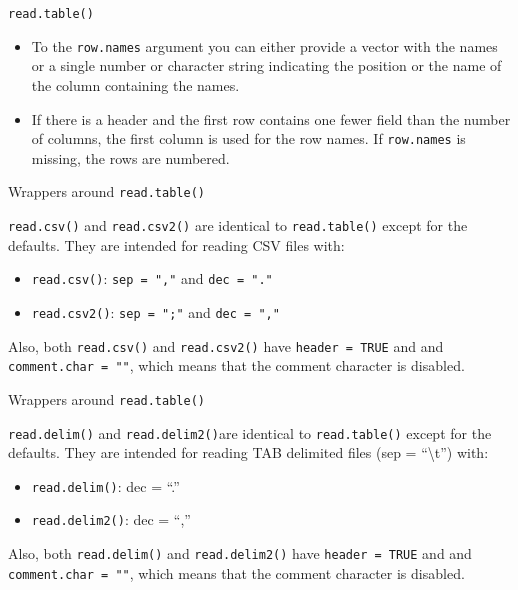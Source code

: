 \documentclass[ignorenonframetext,]{beamer}
\providecommand{\tightlist}{%
  \setlength{\itemsep}{0pt}\setlength{\parskip}{0pt}}
\begin{document}
\begin{frame}[fragile]{\texttt{read.table()}}
\protect\hypertarget{read.table-1}{}

\begin{itemize}
\item
  To the \texttt{row.names} argument you can either provide a vector
  with the names or a single number or character string indicating the
  position or the name of the column containing the names.
\item
  If there is a header and the first row contains one fewer field than
  the number of columns, the first column is used for the row names. If
  \texttt{row.names} is missing, the rows are numbered.
\end{itemize}

\end{frame}

\begin{frame}[fragile]{Wrappers around \texttt{read.table()}}
\protect\hypertarget{wrappers-around-read.table}{}

\texttt{read.csv()} and \texttt{read.csv2()} are identical to
\texttt{read.table()} except for the defaults. They are intended for
reading CSV files with:

\begin{itemize}
\item
  \texttt{read.csv()}: \texttt{sep\ =\ ","} and \texttt{dec\ =\ "."}
\item
  \texttt{read.csv2()}: \texttt{sep\ =\ ";"} and \texttt{dec\ =\ ","}
\end{itemize}

Also, both \texttt{read.csv()} and \texttt{read.csv2()} have
\texttt{header\ =\ TRUE} and and \texttt{comment.char\ =\ ""}, which
means that the comment character is disabled.

\end{frame}

\begin{frame}[fragile]{Wrappers around \texttt{read.table()}}
\protect\hypertarget{wrappers-around-read.table-1}{}

\texttt{read.delim()} and \texttt{read.delim2()}are identical to
\texttt{read.table()} except for the defaults. They are intended for
reading TAB delimited files (sep = ``\textbackslash{}t'') with:

\begin{itemize}
\tightlist
\item
  \texttt{read.delim()}: dec = ``.''
\item
  \texttt{read.delim2()}: dec = ``,''
\end{itemize}

Also, both \texttt{read.delim()} and \texttt{read.delim2()} have
\texttt{header\ =\ TRUE} and and \texttt{comment.char\ =\ ""}, which
means that the comment character is disabled.

\end{frame}
\end{document}
